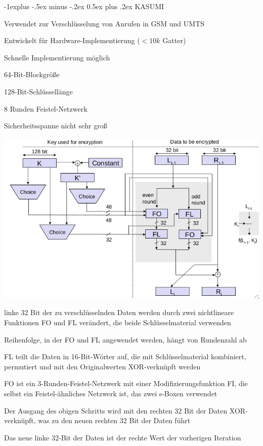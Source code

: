 \documentclass[a4paper]{article}
\makeatletter
\renewcommand{\subsection}{\@startsection{subsection}{2}{0mm}%
 {-1explus -.5ex minus -.2ex}%
 {0.5ex plus .2ex}%
 {\normalfont\normalsize\bfseries}}
\makeatother
\begin{document}
\begin{multicols}{3}
      \subsection{KASUMI}
      \begin{itemize*}
            \item Verwendet zur Verschlüsselung von Anrufen in GSM und UMTS
            \item Entwickelt für Hardware-Implementierung ($<10k$ Gatter)
            \item Schnelle Implementierung möglich
            \item 64-Bit-Blockgröße
            \item 128-Bit-Schlüssellänge
            \item 8 Runden Feistel-Netzwerk
            \item Sicherheitsspanne nicht sehr groß
            \item \includegraphics[width=.6\linewidth]{Assets/NetworkSecurity-kasumi-singe-iteration.png}
            \item linke 32 Bit der zu verschlüsselnden Daten werden durch zwei nichtlineare Funktionen FO und FL verändert, die beide Schlüsselmaterial verwenden
            \item Reihenfolge, in der FO und FL angewendet werden, hängt von Rundenzahl ab
            \item FL teilt die Daten in 16-Bit-Wörter auf, die mit Schlüsselmaterial kombiniert, permutiert und mit den Originalwerten XOR-verknüpft werden
            \item FO ist ein 3-Runden-Feistel-Netzwerk mit einer Modifizierungsfunktion FI, die selbst ein Feistel-ähnliches Netzwerk ist, das zwei s-Boxen verwendet
            \item Der Ausgang des obigen Schritts wird mit den rechten 32 Bit der Daten XOR-verknüpft, was zu den neuen rechten 32 Bit der Daten führt
            \item Das neue linke 32-Bit der Daten ist der rechte Wert der vorherigen Iteration
      \end{itemize*}


\end{multicols}
\end{document}
